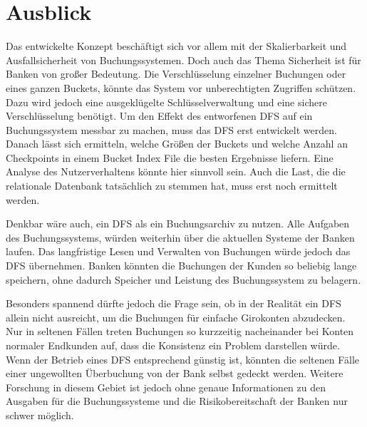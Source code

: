 \documentclass[12pt,oneside,a4paper,parskip]{scrbook}
\newcommand\blankpage{%
    \null
    \thispagestyle{empty}%
    \newpage}
\begin{document}
\cleardoublepage
\chapter{Ausblick}
Das entwickelte Konzept beschäftigt sich vor allem mit der Skalierbarkeit und Ausfallsicherheit von Buchungssystemen. Doch auch das Thema Sicherheit ist für Banken von großer Bedeutung. Die Verschlüsselung einzelner Buchungen oder eines ganzen Buckets, könnte das System vor unberechtigten Zugriffen schützen. Dazu wird jedoch eine ausgeklügelte Schlüsselverwaltung und eine sichere Verschlüsselung benötigt. Um den Effekt des entworfenen DFS auf ein Buchungssystem messbar zu machen, muss das DFS erst entwickelt werden. Danach lässt sich ermitteln, welche Größen der Buckets und welche Anzahl an Checkpoints in einem Bucket Index File die besten Ergebnisse liefern. Eine Analyse des Nutzerverhaltens könnte hier sinnvoll sein. Auch die Last, die die relationale Datenbank tatsächlich zu stemmen hat, muss erst noch ermittelt werden. 

Denkbar wäre auch, ein DFS als ein Buchungsarchiv zu nutzen. Alle Aufgaben des Buchungssystems, würden weiterhin über die aktuellen Systeme der Banken laufen. Das langfristige Lesen und Verwalten von Buchungen würde jedoch das DFS übernehmen. Banken könnten die Buchungen der Kunden so beliebig lange speichern, ohne dadurch Speicher und Leistung des Buchungssystem zu belagern.

Besonders spannend dürfte jedoch die Frage sein, ob in der Realität ein DFS allein nicht ausreicht, um die Buchungen für einfache Girokonten abzudecken. Nur in seltenen Fällen treten Buchungen so kurzzeitig nacheinander bei Konten normaler Endkunden auf, dass die Konsistenz ein Problem darstellen würde. Wenn der Betrieb eines DFS entsprechend günstig ist, könnten die seltenen Fälle einer ungewollten Überbuchung von der Bank selbst gedeckt werden. Weitere Forschung in diesem Gebiet ist jedoch ohne genaue Informationen zu den Ausgaben für die Buchungssysteme und die Risikobereitschaft der Banken nur schwer möglich.

\afterpage{\blankpage}
\end{document}
